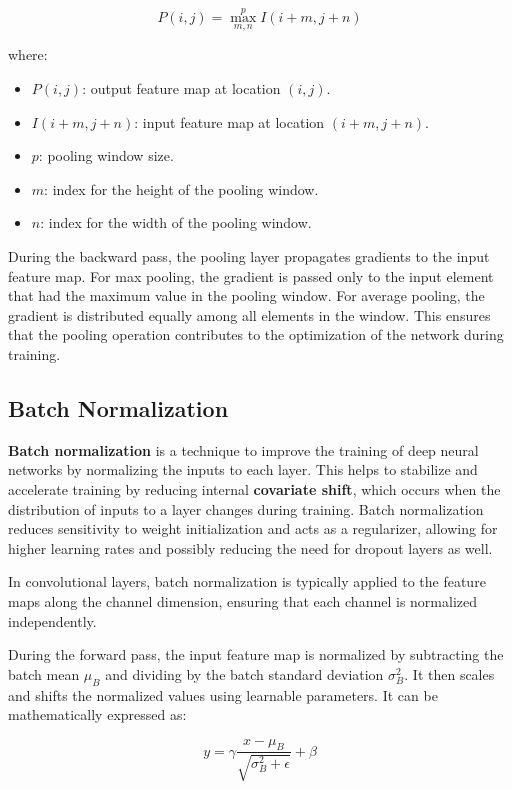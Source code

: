 \documentclass[a4paper]{report}
\begin{document}
\begin{equation*}
P(i,j) = \max_{m,n}^{p} I(i+m,j+n)
\end{equation*}

where:
\begin{itemize}
    \item $P(i,j)$: output feature map at location $(i,j)$.
    \item $I(i+m,j+n)$: input feature map at location $(i+m,j+n)$.
    \item $p$: pooling window size.
    \item $m$: index for the height of the pooling window.
    \item $n$: index for the width of the pooling window.
\end{itemize}

During the backward pass, the pooling layer propagates gradients to the input feature map. For max pooling, the gradient is passed only to the input element that had the maximum value in the pooling window. For average pooling, the gradient is distributed equally among all elements in the window. This ensures that the pooling operation contributes to the optimization of the network during training.

\subsection*{Batch Normalization}

\textbf{Batch normalization} is a technique to improve the training of deep neural networks by normalizing the inputs to each layer. This helps to stabilize and accelerate training by reducing internal \textbf{covariate shift}, which occurs when the distribution of inputs to a layer changes during training. Batch normalization reduces sensitivity to weight initialization and acts as a regularizer, allowing for higher learning rates and possibly reducing the need for dropout layers as well.

In convolutional layers, batch normalization is typically applied to the feature maps along the channel dimension, ensuring that each channel is normalized independently.

During the forward pass, the input feature map is normalized by subtracting the batch mean $\mu_B$ and dividing by the batch standard deviation $\sigma_B^2$. It then scales and shifts the normalized values using learnable parameters. It can be mathematically expressed as:

\begin{equation*}
y = \gamma \frac{x - \mu_B}{\sqrt{\sigma_B^2 + \epsilon}} + \beta
\end{equation*}
\end{document}
